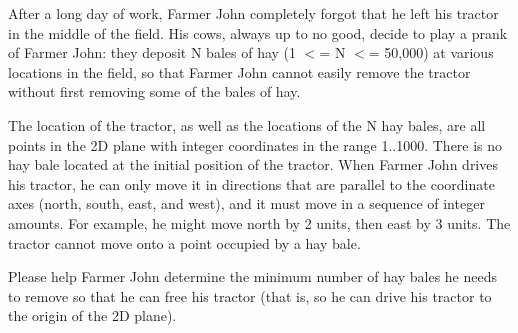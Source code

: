 After a long day of work, Farmer John completely forgot that he left his tractor in the middle of the field.  His cows, always up to no good, decide to play a prank of Farmer John: they deposit N bales of hay (1 $<$= N $<$= 50,000) at various locations in the field, so that Farmer John cannot easily remove the tractor without first removing some of the bales of hay. 

The location of the tractor, as well as the locations of the N hay bales, are all points in the 2D plane with integer coordinates in the range 1..1000.  There is no hay bale located at the initial position of the tractor.  When Farmer John drives his tractor, he can only move it in directions that are parallel to the coordinate axes (north, south, east, and west), and it must move in a sequence of integer amounts.  For example, he might move north by 2 units, then east by 3 units.  The tractor cannot move onto a point occupied by a hay bale.

Please help Farmer John determine the minimum number of hay bales he needs to remove so that he can free his tractor (that is, so he can drive his tractor to the origin of the 2D plane).